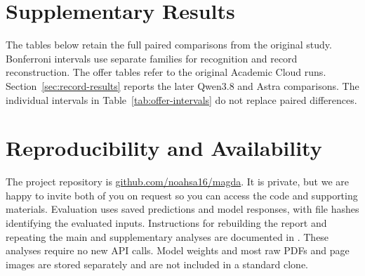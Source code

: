 \section{Supplementary Results}\label{app:tables}
\captionsetup{hypcap=false}
The tables below retain the full paired comparisons from the original study. Bonferroni intervals use separate families for recognition and record reconstruction. The offer tables refer to the original Academic Cloud runs. Section~\ref{sec:record-results} reports the later Qwen3.8 and Astra comparisons. The individual intervals in Table~\ref{tab:offer-intervals} do not replace paired differences.

\begin{center}\begin{minipage}{\linewidth}
\centering\small
{}

\end{minipage}\end{center}

\begin{center}\begin{minipage}{\linewidth}
\centering\small
{}

\end{minipage}\end{center}

\begin{center}\begin{minipage}{\linewidth}
\centering\small
{}\label{tab:offer-intervals}

\end{minipage}\end{center}

\begin{center}\begin{minipage}{\linewidth}
\centering\small
{}

\end{minipage}\end{center}

\small
\section{Reproducibility and Availability}
The project repository is \href{https://github.com/noahsa16/magda}{github.com/noahsa16/magda}. It is private, but we are happy to invite both of you on request so you can access the code and supporting materials. Evaluation uses saved predictions and model responses, with file hashes identifying the evaluated inputs. Instructions for rebuilding the report and repeating the main and supplementary analyses are documented in . These analyses require no new API calls. Model weights and most raw PDFs and page images are stored separately and are not included in a standard clone.

